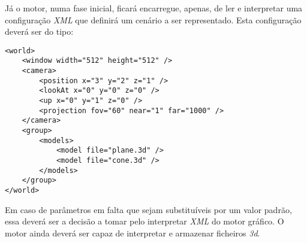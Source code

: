 Já o motor, numa fase inicial, ficará encarregue, apenas, de ler e
interpretar uma configuração \textit{XML} que definirá um cenário
a ser representado.\newline
\break
\noindent
Esta configuração deverá ser do tipo:
\begin{tcolorbox}[
    colback=gray!10!white,
    colframe=black!50!black,
    after upper={\hfill\textbf{xml}}
]
\begin{verbatim}
<world>
    <window width="512" height="512" />
    <camera>
        <position x="3" y="2" z="1" />
        <lookAt x="0" y="0" z="0" />
        <up x="0" y="1" z="0" />
        <projection fov="60" near="1" far="1000" />
    </camera>
    <group>
        <models>
            <model file="plane.3d" />
            <model file="cone.3d" />
        </models>
    </group>
</world>
\end{verbatim}
\end{tcolorbox}

\break
\noindent
Em caso de parâmetros em falta que sejam substituíveis por um valor padrão,
essa deverá ser a decisão a tomar pelo interpretar \textit{XML} do motor
gráfico. O motor ainda deverá ser capaz de interpretar e armazenar ficheiros
\textit{3d}.
